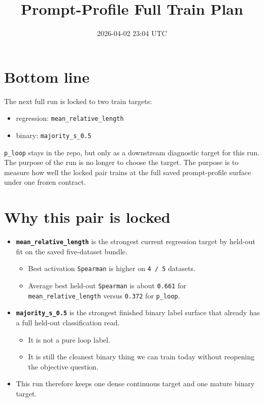 \documentclass[11pt]{article}
\title{Prompt-Profile Full Train Plan}
\author{}
\date{2026-04-02 23:04 UTC}
\begin{document}
\maketitle

\section*{Bottom line}

The next full run is locked to two train targets:
\begin{itemize}[leftmargin=1.5em]
\item regression: \texttt{mean\_relative\_length}
\item binary: \texttt{majority\_s\_0.5}
\end{itemize}

\texttt{p\_loop} stays in the repo, but only as a downstream diagnostic target for this run.
The purpose of the run is no longer to choose the target. The purpose is to measure
how well the locked pair trains at the full saved prompt-profile surface under one frozen contract.

\section*{Why this pair is locked}

\begin{itemize}[leftmargin=1.5em]
\item \textbf{\texttt{mean\_relative\_length}} is the strongest current regression target by held-out fit on the saved five-dataset bundle.
  \begin{itemize}[leftmargin=1.5em]
  \item Best activation \texttt{Spearman} is higher on \texttt{4 / 5} datasets.
  \item Average best held-out \texttt{Spearman} is about \texttt{0.661} for \texttt{mean\_relative\_length} versus \texttt{0.372} for \texttt{p\_loop}.
  \end{itemize}
\item \textbf{\texttt{majority\_s\_0.5}} is the strongest finished binary label surface that already has a full held-out classification read.
  \begin{itemize}[leftmargin=1.5em]
  \item It is not a pure loop label.
  \item It is still the cleanest binary thing we can train today without reopening the objective question.
  \end{itemize}
\item This run therefore keeps one dense continuous target and one mature binary target.
\end{itemize}
\end{document}
